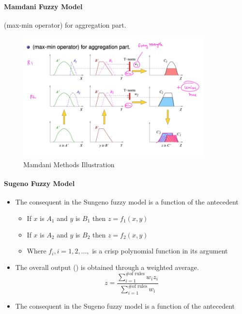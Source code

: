 \documentclass{tron}
\begin{document}
\paragraph{Mamdani Fuzzy Model}
(max-min operator) for aggregation part.
\begin{figure}[H]
	\centering
	\includegraphics[height=250px]{Figs/FuzzyInferencing/mamdani}
	\caption{Mamdani Methods Illustration}
	\label{fig:fuzzy-inf:mamdani}
\end{figure}



\paragraph{Sugeno Fuzzy Model}
\begin{itemize}
	\item The consequent in the Sungeno fuzzy model is a function of the antecedent
	\begin{itemize}
		\item If $x$ is $A_1$ and $y$ is $B_1$ then $z=f_1(x,y)$
		\item If $x$ is $A_2$ and $y$ is $B_2$ then $z=f_2(x,y)$
		\item Where $f_i, i = 1, 2, ..., $ is a crisp polynomial function in its argument
	\end{itemize}
	\item The overall output () is obtained through a weighted average.
	\begin{equation}
		z = \frac{\sum_{i=1}^{\text{\# of rules}} w_i z_i}{\sum_{i=1}^{\text{\# of rules}} w_i}
	\end{equation}
	\item The consequent in the Sugeno fuzzy model is a function of the antecedent
\end{itemize}
\end{document}
